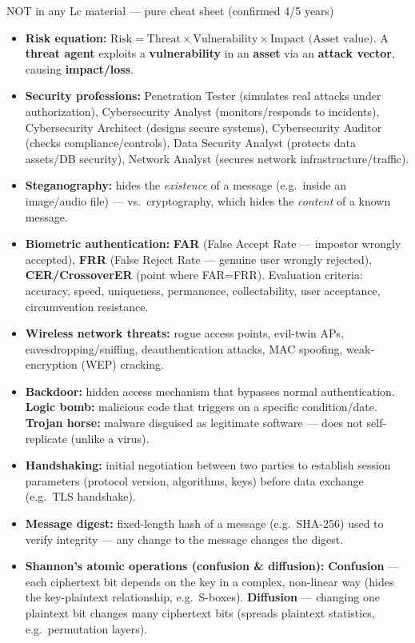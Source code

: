\documentclass[12pt,a4paper]{article}
\begin{document}
\begin{warnbox}{NOT in any Lc material --- pure cheat sheet (confirmed 4/5 years)}
\begin{itemize}[noitemsep]
  \item \textbf{Risk equation:} $\text{Risk} = \text{Threat} \times \text{Vulnerability} \times \text{Impact (Asset value)}$. A \textbf{threat agent} exploits a \textbf{vulnerability} in an \textbf{asset} via an \textbf{attack vector}, causing \textbf{impact/loss}.
  \item \textbf{Security professions:} Penetration Tester (simulates real attacks under authorization), Cybersecurity Analyst (monitors/responds to incidents), Cybersecurity Architect (designs secure systems), Cybersecurity Auditor (checks compliance/controls), Data Security Analyst (protects data assets/DB security), Network Analyst (secures network infrastructure/traffic).
  \item \textbf{Steganography:} hides the \emph{existence} of a message (e.g.\ inside an image/audio file) --- vs.\ cryptography, which hides the \emph{content} of a known message.
  \item \textbf{Biometric authentication:} \textbf{FAR} (False Accept Rate --- impostor wrongly accepted), \textbf{FRR} (False Reject Rate --- genuine user wrongly rejected), \textbf{CER/CrossoverER} (point where FAR=FRR). Evaluation criteria: accuracy, speed, uniqueness, permanence, collectability, user acceptance, circumvention resistance.
  \item \textbf{Wireless network threats:} rogue access points, evil-twin APs, eavesdropping/sniffing, deauthentication attacks, MAC spoofing, weak-encryption (WEP) cracking.
  \item \textbf{Backdoor:} hidden access mechanism that bypasses normal authentication. \textbf{Logic bomb:} malicious code that triggers on a specific condition/date. \textbf{Trojan horse:} malware disguised as legitimate software --- does not self-replicate (unlike a virus).
  \item \textbf{Handshaking:} initial negotiation between two parties to establish session parameters (protocol version, algorithms, keys) before data exchange (e.g.\ TLS handshake).
  \item \textbf{Message digest:} fixed-length hash of a message (e.g.\ SHA-256) used to verify integrity --- any change to the message changes the digest.
  \item \textbf{Shannon's atomic operations (confusion \& diffusion):} \textbf{Confusion} --- each ciphertext bit depends on the key in a complex, non-linear way (hides the key-plaintext relationship, e.g.\ S-boxes). \textbf{Diffusion} --- changing one plaintext bit changes many ciphertext bits (spreads plaintext statistics, e.g.\ permutation layers).
\end{itemize}
\end{warnbox}
\end{document}
